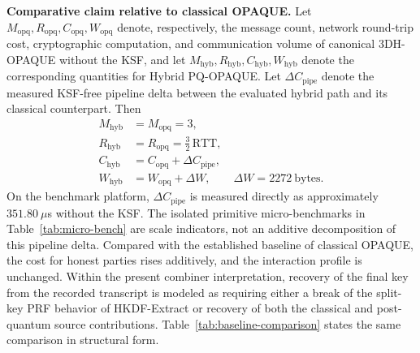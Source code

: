 \documentclass{ieeeijc}
\theoremstyle{remark}
\begin{document}
\medskip
\noindent\textbf{Comparative claim relative to classical OPAQUE.}
Let $M_{\mathrm{opq}}, R_{\mathrm{opq}}, C_{\mathrm{opq}}, W_{\mathrm{opq}}$
denote, respectively, the message count, network round-trip cost,
cryptographic computation, and communication volume of canonical
3DH-OPAQUE without the KSF, and let
$M_{\mathrm{hyb}}, R_{\mathrm{hyb}}, C_{\mathrm{hyb}}, W_{\mathrm{hyb}}$
denote the corresponding quantities for Hybrid PQ-OPAQUE. Let
$\Delta C_{\mathrm{pipe}}$ denote the measured KSF-free pipeline delta
between the evaluated hybrid path and its classical counterpart. Then
\begin{equation}
  \label{eq:complexity-comparison}
  \begin{aligned}
    M_{\mathrm{hyb}} &= M_{\mathrm{opq}} = 3,\\
    R_{\mathrm{hyb}} &= R_{\mathrm{opq}} = \tfrac{3}{2}\,\mathrm{RTT},\\
    C_{\mathrm{hyb}} &= C_{\mathrm{opq}} + \Delta C_{\mathrm{pipe}},\\
    W_{\mathrm{hyb}} &= W_{\mathrm{opq}} + \Delta W,\qquad
      \Delta W = 2272~\text{bytes}.
  \end{aligned}
\end{equation}
On the benchmark platform, $\Delta C_{\mathrm{pipe}}$ is measured directly
as approximately $351.80~\mu$s without the KSF. The isolated primitive
micro-benchmarks in Table~\ref{tab:micro-bench} are scale indicators, not an
additive decomposition of this pipeline delta. Compared with the established
baseline of classical OPAQUE, the
cost for honest parties rises additively, and the interaction profile is
unchanged. Within the present combiner interpretation, recovery of the
final key from the recorded transcript is modeled as requiring either a
break of the split-key PRF behavior of HKDF-Extract or recovery of both the
classical and post-quantum source contributions.
Table~\ref{tab:baseline-comparison} states the same comparison in
structural form.
\end{document}
